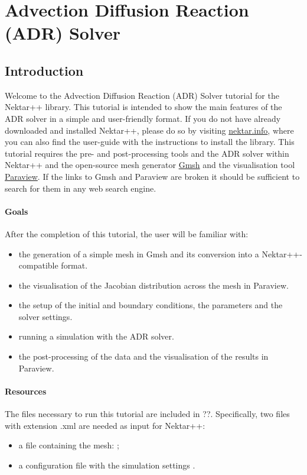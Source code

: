 \chapter{Advection Diffusion Reaction (ADR) Solver}
\label{ADR}

\section*{\Large Introduction}
Welcome to the Advection Diffusion Reaction (ADR) Solver tutorial for the Nektar++ library.
This tutorial is intended to show the main features of the ADR solver in a simple and user-friendly 
format. If you do not have already downloaded and installed Nektar++, please do so by visiting 
\href{http://www.nektar.info}{nektar.info}, where you can also find the user-guide with the instructions 
to install the library. This tutorial requires the pre- and post-processing tools and the ADR 
solver within Nektar++ and the open-source mesh generator \href{http://www.nektar.info}{Gmsh} 
and the visualisation tool \href{}{Paraview}. If the links to Gmsh and Paraview are broken it should 
be sufficient to search for them in any web search engine.  


\subsubsection*{Goals}
After the completion of this tutorial, the user will be familiar with:
\vspace{-0.5cm}
\begin{itemize}
\item the generation of a simple mesh in Gmsh and its conversion into a Nektar++-compatible format.
\item the visualisation of the Jacobian distribution across the mesh in Paraview.
\item the setup of the initial and boundary conditions, the parameters and the solver settings.
\item running a simulation with the ADR solver.
\item the post-processing of the data and the visualisation of the results in Paraview.
\end{itemize}

\subsubsection*{Resources}
The files necessary to run this tutorial are included in ??.  
Specifically, two files with extension \textsf{.xml} are needed as input for Nektar++: 
\vspace{-0.5cm}
\begin{itemize}
\item a file containing the mesh: ;
\item a configuration file with the simulation settings .
\end{itemize}


